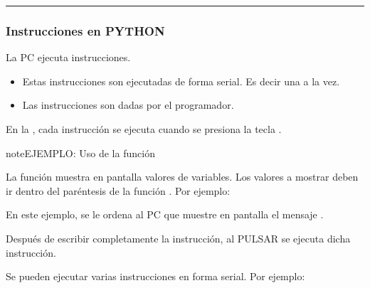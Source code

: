 \documentclass[letterpaper,10pt,spanish]{sphinxmanual}
\begin{document}
\bigskip\hrule\bigskip



\subsubsection{Instrucciones en PYTHON}
\label{\detokenize{1_guias/10programacion/G1025:instrucciones-en-python}}
\sphinxAtStartPar
La PC ejecuta instrucciones.
\begin{itemize}
\item {} 
\sphinxAtStartPar
Estas instrucciones son ejecutadas de forma serial. Es decir una a la vez.

\item {} 
\sphinxAtStartPar
Las instrucciones son dadas por el programador.

\end{itemize}

\sphinxAtStartPar
En la , cada instrucción se ejecuta cuando se presiona la tecla .

\begin{sphinxadmonition}{note}{EJEMPLO: Uso de la función }

\sphinxAtStartPar
La función  muestra en pantalla valores de variables. Los valores a mostrar deben ir dentro del paréntesis de la función .  Por ejemplo:

\begin{sphinxVerbatim}[commandchars=\\\{\},numbers=left,firstnumber=1,stepnumber=1]
\end{sphinxVerbatim}

\sphinxAtStartPar
En este ejemplo, se le ordena al PC que muestre en pantalla el mensaje .

\sphinxAtStartPar
Después de escribir completamente la instrucción, al PULSAR  se ejecuta dicha instrucción.
\end{sphinxadmonition}

\sphinxAtStartPar
Se pueden ejecutar varias instrucciones en forma serial. Por ejemplo:
\end{document}
